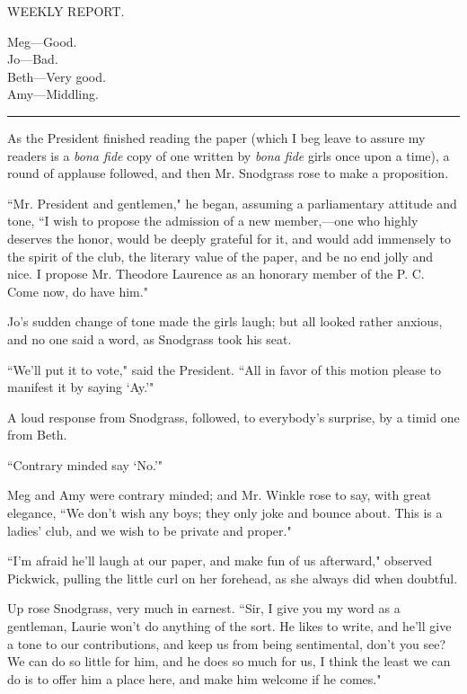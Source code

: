 WEEKLY REPORT.

Meg---Good.\\
Jo---Bad.\\
Beth---Very good.\\
Amy---Middling.

\begin{center}\rule{0.5\linewidth}{0.5pt}\end{center}

As the President finished reading the paper (which I beg leave to assure
my readers is a \emph{bona fide} copy of one written by \emph{bona fide}
girls once upon a time), a round of applause followed, and then Mr.
Snodgrass rose to make a proposition.

``Mr. President and gentlemen," he began, assuming a parliamentary
attitude and tone, ``I wish to propose the admission of a new
member,---one who highly deserves the honor, would be deeply grateful
for it, and would add immensely to the spirit of the club, the literary
value of the paper, and be no end jolly and nice. I propose Mr. Theodore
Laurence as an honorary member of the P. C. Come now, do have him."

Jo's sudden change of tone made the girls laugh; but all
looked rather anxious, and no one said a word, as Snodgrass took his
seat.

``We'll put it to vote," said the President. ``All in
favor of this motion please to manifest it by saying
`Ay.'"

A loud response from Snodgrass, followed, to everybody's
surprise, by a timid one from Beth.

``Contrary minded say `No.'"

Meg and Amy were contrary minded; and Mr. Winkle rose to say, with great
elegance, ``We don't wish any boys; they only joke and
bounce about. This is a ladies' club, and we wish to be
private and proper."

``I'm afraid he'll laugh at our paper,
and make fun of us afterward," observed Pickwick, pulling the little
curl on her forehead, as she always did when doubtful.

Up rose Snodgrass, very much in earnest. ``Sir, I give you my word as a
gentleman, Laurie won't do anything of the sort. He
likes to write, and he'll give a tone to our
contributions, and keep us from being sentimental, don't
you see? We can do so little for him, and he does so much for us, I
think the least we can do is to offer him a place here, and make him
welcome if he comes."

